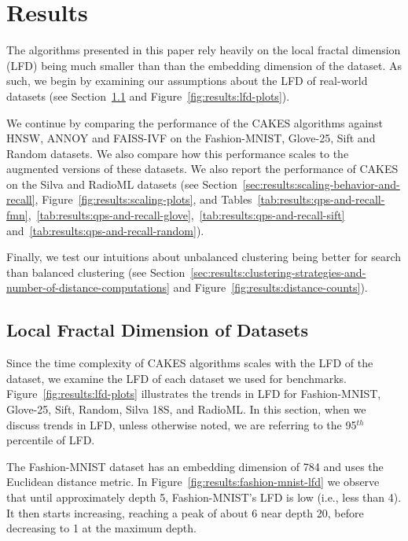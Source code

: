 \section{Results}
\label{sec:results}

The algorithms presented in this paper rely heavily on the local fractal dimension (LFD) being much smaller than than the embedding dimension of the dataset.
As such, we begin by examining our assumptions about the LFD of real-world datasets (see Section~\ref{sec:results:lfd-of-datasets} and Figure~\ref{fig:results:lfd-plots}).

We continue by comparing the performance of the CAKES algorithms against HNSW, ANNOY and FAISS-IVF on the Fashion-MNIST, Glove-25, Sift and Random datasets.
We also compare how this performance scales to the augmented versions of these datasets.
We also report the performance of CAKES on the Silva and RadioML datasets (see Section~\ref{sec:results:scaling-behavior-and-recall}, Figure~\ref{fig:results:scaling-plots}, and Tables~\ref{tab:results:qps-and-recall-fmn},~\ref{tab:results:qps-and-recall-glove},~\ref{tab:results:qps-and-recall-sift} and~\ref{tab:results:qps-and-recall-random}).

Finally, we test our intuitions about unbalanced clustering being better for search
than balanced clustering (see Section~\ref{sec:results:clustering-strategies-and-number-of-distance-computations} and Figure~\ref{fig:results:distance-counts}).


\subsection{Local Fractal Dimension of Datasets}
\label{sec:results:lfd-of-datasets}

Since the time complexity of CAKES algorithms scales with the LFD of the dataset, we examine the LFD of each dataset we used for benchmarks.
Figure~\ref{fig:results:lfd-plots} illustrates the trends in LFD for Fashion-MNIST, Glove-25, Sift, Random, Silva 18S, and RadioML.
In this section, when we discuss trends in LFD, unless otherwise noted, we are referring to the 95$^{th}$ percentile of LFD.

The Fashion-MNIST dataset has an embedding dimension of 784 and uses the Euclidean distance metric.
In Figure~\ref{fig:results:fashion-mnist-lfd} we observe that until approximately depth 5, Fashion-MNIST's LFD is low (i.e., less than 4).
It then starts increasing, reaching a peak of about 6 near depth 20, before decreasing to 1 at the maximum depth.

